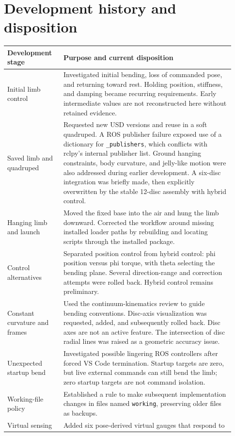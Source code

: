 \documentclass[11pt,letterpaper]{article}
\begin{document}
\section{Development history and disposition}
\begin{longtable}{p{0.23\linewidth}p{0.70\linewidth}}
\toprule
Development stage & Purpose and current disposition\\\midrule
\endhead
Initial limb control & Investigated initial bending, loss of commanded pose,
and returning toward rest. Holding position, stiffness, and damping became
recurring requirements. Early intermediate values are not reconstructed here
without retained evidence.\\
Saved limb and quadruped & Requested new USD versions and reuse in a soft
quadruped. A ROS publisher failure exposed use of a dictionary for
\texttt{\_publishers}, which conflicts with rclpy's internal publisher list.
Ground hanging constraints, body curvature, and jelly-like motion were also
addressed during earlier development. A six-disc integration was briefly made,
then explicitly overwritten by the stable 12-disc assembly with hybrid control.\\
Hanging limb and launch & Moved the fixed base into the air and hung the limb
downward. Corrected the workflow around missing installed loader paths by
rebuilding and locating scripts through the installed package.\\
Control alternatives & Separated position control from hybrid control:
phi position versus phi torque, with theta selecting the bending plane.
Several direction-range and correction attempts were rolled back. Hybrid
control remains preliminary.\\
Constant curvature and frames & Used the continuum-kinematics review to
guide bending conventions. Disc-axis visualization was requested, added,
and subsequently rolled back. Disc axes are not an active feature. The
intersection of disc radial lines was raised as a geometric accuracy issue.\\
Unexpected startup bend & Investigated possible lingering ROS controllers
after forced VS Code termination. Startup targets are zero, but live external
commands can still bend the limb; zero startup targets are not command isolation.\\
Working-file policy & Established a rule to make subsequent implementation
changes in files named \texttt{working}, preserving older files as backups.\\
Virtual sensing & Added six pose-derived virtual gauges that respond to

\end{longtable}
\end{document}
